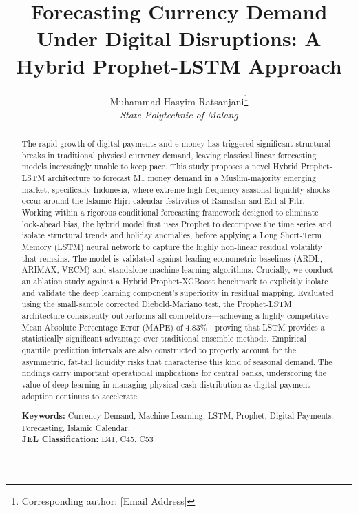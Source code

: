 \documentclass[12pt, letterpaper]{article}
\begin{document}
\title{\textbf{Forecasting Currency Demand Under Digital Disruptions: A Hybrid Prophet-LSTM Approach}}
\author{
    Muhammad Hasyim Ratsanjani\thanks{Corresponding author: [Email Address]} \\
    \textit{State Polytechnic of Malang}
}
\date{}

\maketitle

\begin{abstract}
\noindent The rapid growth of digital payments and e-money has triggered significant structural breaks in traditional physical currency demand, leaving classical linear forecasting models increasingly unable to keep pace. This study proposes a novel Hybrid Prophet-LSTM architecture to forecast M1 money demand in a Muslim-majority emerging market, specifically Indonesia, where extreme high-frequency seasonal liquidity shocks occur around the Islamic Hijri calendar festivities of Ramadan and Eid al-Fitr. Working within a rigorous conditional forecasting framework designed to eliminate look-ahead bias, the hybrid model first uses Prophet to decompose the time series and isolate structural trends and holiday anomalies, before applying a Long Short-Term Memory (LSTM) neural network to capture the highly non-linear residual volatility that remains. The model is validated against leading econometric baselines (ARDL, ARIMAX, VECM) and standalone machine learning algorithms. Crucially, we conduct an ablation study against a Hybrid Prophet-XGBoost benchmark to explicitly isolate and validate the deep learning component's superiority in residual mapping. Evaluated using the small-sample corrected Diebold-Mariano test, the Prophet-LSTM architecture consistently outperforms all competitors---achieving a highly competitive Mean Absolute Percentage Error (MAPE) of 4.83\%---proving that LSTM provides a statistically significant advantage over traditional ensemble methods. Empirical quantile prediction intervals are also constructed to properly account for the asymmetric, fat-tail liquidity risks that characterise this kind of seasonal demand. The findings carry important operational implications for central banks, underscoring the value of deep learning in managing physical cash distribution as digital payment adoption continues to accelerate.

\vspace{0.5cm}
\noindent \textbf{Keywords:} Currency Demand, Machine Learning, LSTM, Prophet, Digital Payments, Forecasting, Islamic Calendar. \\
\noindent \textbf{JEL Classification:} E41, C45, C53
\end{abstract}
\end{document}
